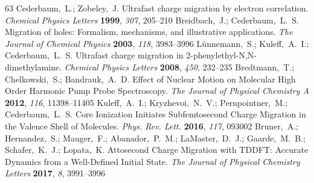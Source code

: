 \documentclass[journal=jacsat,manuscript=article]{achemso}
\begin{document}
\begin{mcitethebibliography}{63}
\EndOfBibitem
{}
Cederbaum,~L.; Zobeley,~J. Ultrafast charge migration by electron correlation.
  \emph{Chemical Physics Letters} \textbf{1999}, \emph{307}, 205--210\relax
\mciteBstWouldAddEndPuncttrue
\mciteSetBstMidEndSepPunct{\mcitedefaultmidpunct}
{\mcitedefaultendpunct}{\mcitedefaultseppunct}\relax
\EndOfBibitem
{}
Breidbach,~J.; Cederbaum,~L.~S. Migration of holes: Formalism, mechanisms, and
  illustrative applications. \emph{The Journal of Chemical Physics}
  \textbf{2003}, \emph{118}, 3983--3996\relax
\mciteBstWouldAddEndPuncttrue
\mciteSetBstMidEndSepPunct{\mcitedefaultmidpunct}
{\mcitedefaultendpunct}{\mcitedefaultseppunct}\relax
\EndOfBibitem
{}
Lünnemann,~S.; Kuleff,~A.~I.; Cederbaum,~L.~S. Ultrafast charge migration in
  2-phenylethyl-N,N-dimethylamine. \emph{Chemical Physics Letters}
  \textbf{2008}, \emph{450}, 232--235\relax
\mciteBstWouldAddEndPuncttrue
\mciteSetBstMidEndSepPunct{\mcitedefaultmidpunct}
{\mcitedefaultendpunct}{\mcitedefaultseppunct}\relax
\EndOfBibitem
{}
Bredtmann,~T.; Chelkowski,~S.; Bandrauk,~A.~D. Effect of Nuclear Motion on
  Molecular High Order Harmonic Pump Probe Spectroscopy. \emph{The Journal of
  Physical Chemistry A} \textbf{2012}, \emph{116}, 11398--11405\relax
\mciteBstWouldAddEndPuncttrue
\mciteSetBstMidEndSepPunct{\mcitedefaultmidpunct}
{\mcitedefaultendpunct}{\mcitedefaultseppunct}\relax
\EndOfBibitem
{}
Kuleff,~A.~I.; Kryzhevoi,~N.~V.; Pernpointner,~M.; Cederbaum,~L.~S. Core
  Ionization Initiates Subfemtosecond Charge Migration in the Valence Shell of
  Molecules. \emph{Phys. Rev. Lett.} \textbf{2016}, \emph{117}, 093002\relax
\mciteBstWouldAddEndPuncttrue
\mciteSetBstMidEndSepPunct{\mcitedefaultmidpunct}
{\mcitedefaultendpunct}{\mcitedefaultseppunct}\relax
\EndOfBibitem
{}
Bruner,~A.; Hernandez,~S.; Mauger,~F.; Abanador,~P.~M.; LaMaster,~D.~J.;
  Gaarde,~M.~B.; Schafer,~K.~J.; Lopata,~K. Attosecond Charge Migration with
  TDDFT: Accurate Dynamics from a Well-Defined Initial State. \emph{The Journal
  of Physical Chemistry Letters} \textbf{2017}, \emph{8}, 3991--3996\relax

\end{mcitethebibliography}
\end{document}
